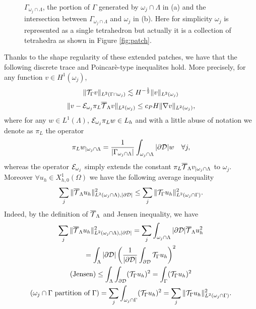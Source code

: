 \begin{figure}\label{fig:gamma_generated}
\centering
{}
\qquad \qquad
{}
\caption{$\Gamma_{\omega_j \cap \Lambda}$, the portion of $\Gamma$ generated by $\omega_j \cap \Lambda$ in (a) and the intersection between $\Gamma_{\omega_j \cap \Lambda}$ and $\omega_j$ in (b). Here for simplicity $\omega_j$ is represented as a single tetrahedron but actually it is a collection of tetrahedra as shown in Figure \ref{fig:patch}.}
\end{figure}
Thanks to the shape regularity of these extended patches, we have that the following discrete trace and Poincarè-type inequalites hold. More precisely, for any function $v\in H^1(\omega_j)$, 
\begin{equation}\label{discr_trace_ineq}
\|\trace v\|_{L^2(\Gamma\cap \omega_j)} \lesssim H^{-\frac 12} \|v\|_{L^2(\omega_j)}
\end{equation}
\begin{equation}\label{disc_poincare_ineq}
\|v- \mathcal{E}_{\patch} \pi_L\mtrace v\|_{L^2(\omega_j)} \leq c_P H \|\nabla v\|_{L^2(\omega_j)},
\end{equation}
where for any $w \in L^1(\Lambda)$, $ \mathcal{E}_{\omega _j}\pi_Lw \in L_h$ and with a little abuse of notation we denote as $\pi_L$ the operator
\begin{equation*}
\pi_Lw_{|\omega _j \cap \Lambda} =\frac{1}{|\Gamma_{\omega _j\cap \Lambda}|}\int_{\omega _j\cap \Lambda}|\partial\mathcal{D}| w\quad \forall j,
\end{equation*}   
whereas the operator $\mathcal{E}_{\omega _j}$ simply extends the constant $\pi_L{\overline{\mathcal{T}}_\Lambda} v_{|\omega _j \cap \Lambda}$ to $\omega _j$.
Moreover $\forall u_h \in X^1_{h,0}(\Omega)$ we have the following average inequality 
\begin{equation*}
\sum _j \|{\overline{\mathcal{T}}_\Lambda} u_h\|^2_{L^2(\omega _j \cap \Lambda),|\partial\mathcal{D}| } \leq \sum _j \|{\mathcal{T}_\Gamma}  u_h\|^2_{L^2(\omega_j\cap \Gamma)}.
\end{equation*}
Indeed, by the definition of ${\overline{\mathcal{T}}_\Lambda}$ and Jensen inequality, we have
\begin{multline*}
\sum _j \|{\overline{\mathcal{T}}_\Lambda} u_h\|^2_{L^2(\omega _j \cap \Lambda),|\partial\mathcal{D}| }
= \sum _j\int_{\omega _j \cap \Lambda} |\partial\mathcal{D}| {\overline{\mathcal{T}}_\Lambda} u_h^2 
\\
= \int_{\Lambda} |\partial\mathcal{D}| \left( \frac{1}{|\partial\mathcal{D}|} \int_{\partial\mathcal{D}} {\mathcal{T}_\Gamma} u_h \right)^2
\\
(\text{Jensen})\leq \int_{\Lambda} \int_{\partial\mathcal{D}} ({\mathcal{T}_\Gamma} u_h)^2
= \int_{\Gamma} ({\mathcal{T}_\Gamma} u_h)^2
\\
(\omega _j \cap \Gamma \text{ partition of } \Gamma)= \sum _j \int_{\omega _j \cap \Gamma} ({\mathcal{T}_\Gamma} u_h)^2
= \sum _j \|{\mathcal{T}_\Gamma} u_h\|^2_{L^2(\omega _j \cap \Gamma)}.
\end{multline*}

